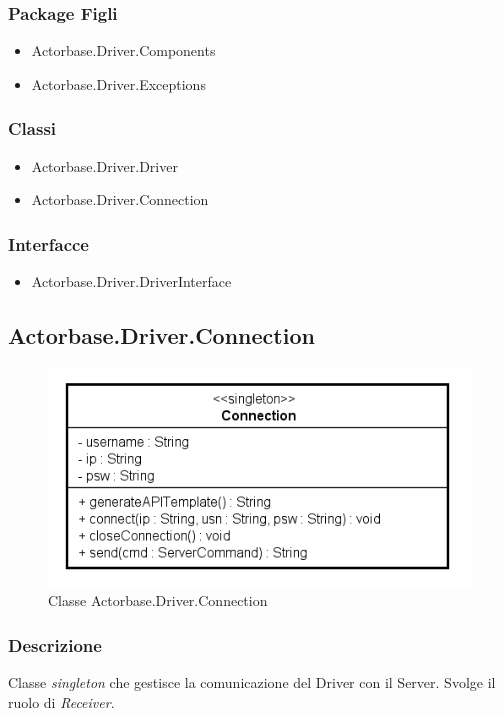 \documentclass[a4paper]{article}
\begin{document}
		\subsubsection{Package Figli}
			\begin{itemize}
				\item Actorbase.Driver.Components
				\item Actorbase.Driver.Exceptions
			\end{itemize}
			
		\subsubsection{Classi}
			\begin{itemize}
				\item Actorbase.Driver.Driver
				\item Actorbase.Driver.Connection
			\end{itemize}
			
		\subsubsection{Interfacce}
			\begin{itemize}
				\item Actorbase.Driver.DriverInterface
			\end{itemize}
		
		\subsection{Actorbase.Driver.Connection}
		\begin{figure} [H]
			\centering
			\includegraphics[scale=0.5]{ST/Client/ConnectionClasse.png}
        	\caption{Classe Actorbase.Driver.Connection}
		\end{figure}
		
		\subsubsection{Descrizione}
			Classe \emph{singleton} che gestisce la comunicazione del Driver con il Server. Svolge il ruolo di \emph{Receiver}.
\end{document}
